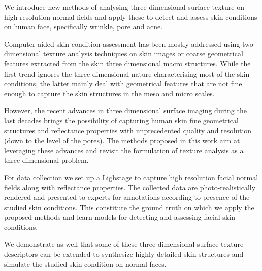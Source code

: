 We introduce new methods of analysing three dimensional surface texture on high resolution normal fields and apply these to detect and assess skin conditions on human face, specifically wrinkle, pore and acne. 

Computer aided skin condition assessment has been mostly addressed using two dimensional texture analysis techniques on skin images or coarse geometrical features extracted from the skin three dimensional macro structures. While the first trend ignores the three dimensional nature characterising most of the skin conditions, the latter mainly deal with geometrical features that are not fine enough to capture the skin structures in the meso and micro scales.

However, the recent advances in three dimensional surface imaging during the last decades brings the possibility of capturing human skin fine geometrical structures and reflectance properties with unprecedented quality and resolution (down to the level of the pores). The methods proposed in this work aim at leveraging these advances and revisit the formulation of texture analysis as a three dimensional problem.

For data collection we set up a Lighstage to capture high resolution facial normal fields along with reflectance properties. The collected data are photo-realistically rendered and presented to experts for annotations according to presence of the studied skin conditions. This constitute the ground truth on which we  apply the proposed methods and learn models for detecting and assessing facial skin conditions.

We demonstrate as well that some of these three dimensional surface texture descriptors can be extended to synthesize highly detailed skin structures and simulate the studied skin condition on normal faces.